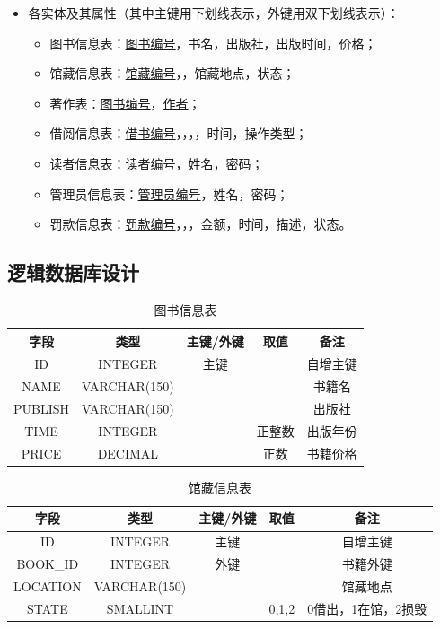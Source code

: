 \documentclass[a4paper,14pt]{article}
\begin{document}
\begin{itemize}
    \item 各实体及其属性（其中主键用下划线表示，外键用双下划线表示）：
    \begin{itemize}
        \item 图书信息表：\underline{图书编号}，书名，出版社，出版时间，价格；
        \item 馆藏信息表：\underline{馆藏编号}，，馆藏地点，状态；
        \item 著作表：\underline{图书编号}，\underline{作者}；
        \item 借阅信息表：\underline{借书编号}，，，，时间，操作类型；
        \item 读者信息表：\underline{读者编号}，姓名，密码；
        \item 管理员信息表：\underline{管理员编号}，姓名，密码；
        \item 罚款信息表：\underline{罚款编号}，，，金额，时间，描述，状态。
        
    \end{itemize}
\end{itemize}

\subsection{逻辑数据库设计}

\begin{table}[htbp]
    \centering
    \caption{图书信息表}
    \begin{tabularx}{\textwidth}{|C|C|C|C|C|}
    \hline
    字段 & 类型 & 主键/外键 & 取值 & 备注 \\
    \hline
    ID & INTEGER & 主键 &  & 自增主键 \\
    \hline
    NAME & VARCHAR(150) &  &  & 书籍名 \\
    \hline
    PUBLISH & VARCHAR(150) &  &  & 出版社 \\
    \hline
    TIME & INTEGER &  & 正整数 & 出版年份 \\
    \hline
    PRICE & DECIMAL &  & 正数 & 书籍价格 \\
    \hline
    \end{tabularx}
\end{table}

    \begin{table}[htbp]
    \centering
    \caption{馆藏信息表}
    \begin{tabularx}{\textwidth}{|C|C|C|C|C|}
        \hline
        字段 & 类型 & 主键/外键 & 取值 & 备注 \\
        \hline
        ID & INTEGER & 主键 &  & 自增主键 \\
        \hline
        BOOK\_ID & INTEGER & 外键 &  & 书籍外键 \\
        \hline
        LOCATION & VARCHAR(150) &  &  & 馆藏地点 \\
        \hline
        STATE & SMALLINT &  & 0,1,2 & 0借出，1在馆，2损毁 \\
        \hline
        \end{tabularx}
\end{table}
\end{document}
